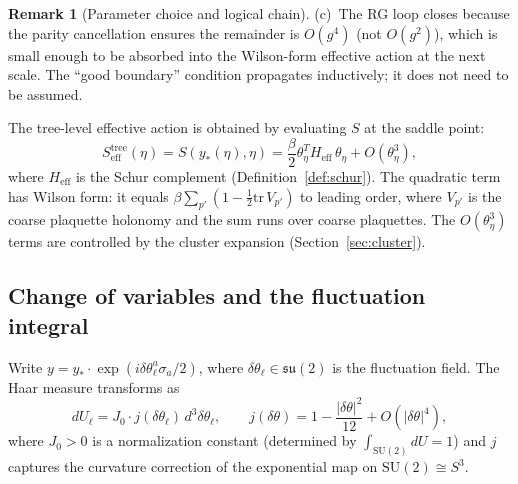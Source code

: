 \documentclass[11pt]{article}
\theoremstyle{definition}
\newtheorem{remark}[theorem]{Remark}
\newcommand{\SU}{\mathrm{SU}}
\newcommand{\su}{\mathfrak{su}}
\newcommand{\tr}{\mathrm{tr}}
\begin{document}
\begin{remark}[Parameter choice and logical chain]
(c)~The RG loop closes because the parity cancellation
ensures the remainder is $O(g^4)$ (not $O(g^2)$), which is
small enough to be absorbed into the Wilson-form effective
action at the next scale.  The ``good boundary'' condition
propagates inductively; it does not need to be assumed.
\end{remark}

The tree-level effective action is obtained by evaluating $S$ at the
saddle point:
\begin{equation}\label{eq:tree}
S_{\mathrm{eff}}^{\mathrm{tree}}(\eta)
=S(y_*(\eta),\eta)
=\frac{\beta}{2}\theta_\eta^T H_{\mathrm{eff}}\,\theta_\eta
+O(\theta_\eta^3),
\end{equation}
where $H_{\mathrm{eff}}$ is the Schur complement
(Definition~\ref{def:schur}).  The quadratic term has Wilson form:
it equals $\beta\sum_{p'}(1-\frac{1}{2}\tr\,V_{p'})$ to leading
order, where $V_{p'}$ is the coarse plaquette holonomy and the sum
runs over coarse plaquettes.  The $O(\theta_\eta^3)$ terms are
controlled by the cluster expansion (Section~\ref{sec:cluster}).

\subsection{Change of variables and the fluctuation integral}
\label{subsec:fluctuation}

Write $y=y_*\cdot\exp(i\delta\theta^a_\ell\sigma_a/2)$, where
$\delta\theta_\ell\in\su(2)$ is the fluctuation field.  The Haar
measure transforms as
\begin{equation}
dU_\ell=J_0\cdot j(\delta\theta_\ell)\,d^3\delta\theta_\ell,
\qquad j(\delta\theta)=1-\frac{|\delta\theta|^2}{12}+O(|\delta\theta|^4),
\end{equation}
where $J_0>0$ is a normalization constant (determined by
$\int_{\SU(2)}dU=1$) and $j$ captures the curvature correction of
the exponential map on $\SU(2)\cong S^3$.
\end{document}
